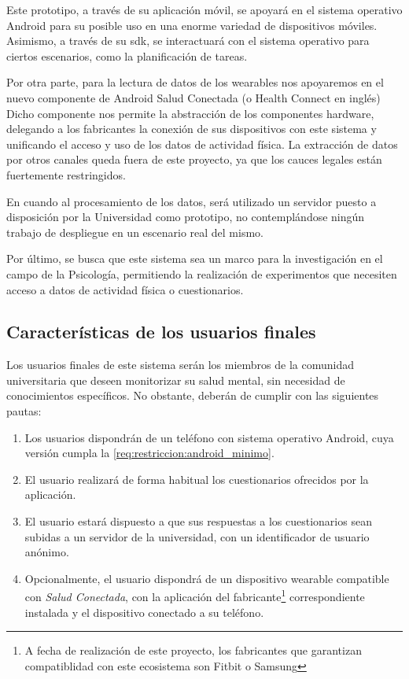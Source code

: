         Este prototipo, a través de su aplicación móvil, se apoyará en el sistema operativo Android para su posible uso en una enorme variedad de dispositivos móviles. Asimismo, a través de su \gls{sdk}, se interactuará con el sistema operativo para ciertos escenarios, como la planificación de tareas.

        Por otra parte, para la lectura de datos de los \glspl{wearable} nos apoyaremos en el nuevo componente de Android Salud Conectada (o Health Connect en inglés) Dicho componente nos permite la abstracción de los componentes hardware, delegando a los fabricantes la conexión de sus dispositivos con este sistema y unificando el acceso y uso de los datos de actividad física. La extracción de datos por otros canales queda fuera de este proyecto, ya que los cauces legales están fuertemente restringidos. 

        En cuando al procesamiento de los datos, será utilizado un servidor puesto a disposición por la Universidad como prototipo, no contemplándose ningún trabajo de despliegue en un escenario real del mismo.

        
        Por último, se busca que este sistema sea un marco para la investigación en el campo de la Psicología, permitiendo la realización de experimentos que necesiten acceso a datos de actividad física o cuestionarios.


    \subsection{Características de los usuarios finales}
        \label{req:descripcion:usuarios}
        
        Los usuarios finales de este sistema serán los miembros de la comunidad universitaria que deseen monitorizar su salud mental, sin necesidad de conocimientos específicos. No obstante, deberán de cumplir con las siguientes pautas:
    
        \begin{enumerate}
            \item Los usuarios dispondrán de un teléfono con sistema operativo Android, cuya versión cumpla la \ref{req:restriccion:android_minimo}.
            \item El usuario realizará de forma habitual los cuestionarios ofrecidos por la aplicación.
            \item El usuario estará dispuesto a que sus respuestas a los cuestionarios sean subidas a un servidor de la universidad, con un identificador de usuario anónimo.
            \item Opcionalmente, el usuario dispondrá de un dispositivo \gls{wearable} compatible con \textit{Salud Conectada}, con la aplicación del fabricante\footnote{A fecha de realización de este proyecto, los fabricantes que garantizan compatiblidad con este ecosistema son Fitbit o Samsung} correspondiente instalada y el dispositivo conectado a su teléfono.
            
        \end{enumerate}
        
